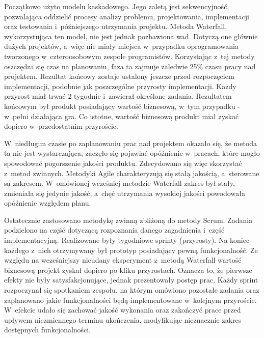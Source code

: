 Początkowo użyto modelu kaskadowego. Jego zaletą jest sekwencyjność, pozwalająca oddzielić procesy analizy problemu, projektowania, implementacji oraz testowania i~późniejszego utrzymania projektu. Metoda Waterfall, wykorzystująca ten model, nie jest jednak pozbawiona wad. 
Dotyczą one głównie dużych projektów, a~więc nie miały miejsca w~przypadku oprogramowania tworzonego w~czteroosobowym zespole programistów. Korzystając z~tej metody oszczędza się czas na planowaniu, faza ta zajmuje zaledwie 25\% czasu pracy nad projektem. Rezultat końcowy zostaje ustalony jeszcze przed rozpoczęciem implementacji, podobnie jak poszczególne przyrosty implementacji. Każdy przyrost miał trwać 2 tygodnie i~zawierał określone zadania. Rezultatem końcowym był produkt posiadający wartość biznesową, w~tym przypadku - w~pełni działająca gra. Co istotne, wartość biznesową produkt miał zyskać dopiero w~przedostatnim przyroście.

W~niedługim czasie po zaplanowaniu prac nad projektem okazało się, że metoda ta nie jest wystarczająca, zaczęło się pojawiać opóźnienie w~pracach, które mogło spowodować pogorszenie jakości produktu. Zdecydowano się więc skorzystać z~metod zwinnych. Metodyki Agile charakteryzują się stałą jakością, a~sterowane są zakresem. W~omówionej wcześniej metodzie Waterfall zakres był stały, zmieniała się jedynie jakość, a~chęć utrzymania wysokiej jakości powodowała opóźnienie względem planu. 

Ostatecznie zastosowano metodykę zwinną zbliżoną do metody Scrum. Zadania podzielono na część dotyczącą rozpoznania danego zagadnienia i~część implementacyjną. Realizowane były tygodniowe sprinty (przyrosty). Na koniec każdego z~nich otrzymywany był prototyp posiadający pewną funkcjonalność. Ze względu na wcześniejszy nieudany eksperyment z~metodą Waterfall wartość biznesową projekt zyskał dopiero po kliku przyrostach. Oznacza to, że pierwsze efekty nie były satysfakcjonujące, jednak prezentowały postęp prac. Każdy sprint rozpoczynał się spotkaniem zespołu, na którym omówiono pozostałe zadania oraz zaplanowano jakie funkcjonalności będą implementowane w~kolejnym przyroście. W~efekcie udało się zachować jakość wykonania oraz zakończyć prace przed upływem niezmiennego terminu ukończenia, modyfikując nieznacznie zakres dostępnych funkcjonalności.